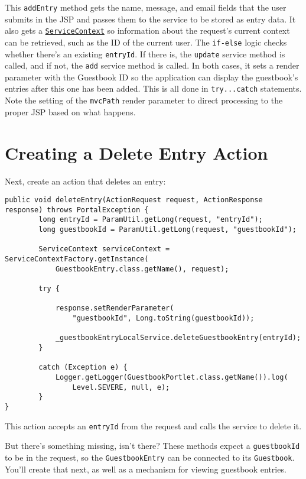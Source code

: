 This \texttt{addEntry} method gets the name, message, and email fields
that the user submits in the JSP and passes them to the service to be
stored as entry data. It also gets a
\href{/docs/7-2/frameworks/-/knowledge_base/f/understanding-servicecontext}{\texttt{ServiceContext}}
so information about the request's current context can be retrieved,
such as the ID of the current user. The \texttt{if-else} logic checks
whether there's an existing \texttt{entryId}. If there is, the
\texttt{update} service method is called, and if not, the \texttt{add}
service method is called. In both cases, it sets a render parameter with
the Guestbook ID so the application can display the guestbook's entries
after this one has been added. This is all done in \texttt{try...catch}
statements. Note the setting of the \texttt{mvcPath} render parameter to
direct processing to the proper JSP based on what happens.

\section{Creating a Delete Entry
Action}\label{creating-a-delete-entry-action}

Next, create an action that deletes an entry:

\begin{verbatim}
public void deleteEntry(ActionRequest request, ActionResponse response) throws PortalException {
        long entryId = ParamUtil.getLong(request, "entryId");
        long guestbookId = ParamUtil.getLong(request, "guestbookId");

        ServiceContext serviceContext = ServiceContextFactory.getInstance(
            GuestbookEntry.class.getName(), request);

        try {

            response.setRenderParameter(
                "guestbookId", Long.toString(guestbookId));

            _guestbookEntryLocalService.deleteGuestbookEntry(entryId);
        }

        catch (Exception e) {
            Logger.getLogger(GuestbookPortlet.class.getName()).log(
                Level.SEVERE, null, e);
        }
}
\end{verbatim}

This action accepts an \texttt{entryId} from the request and calls the
service to delete it.

But there's something missing, isn't there? These methods expect a
\texttt{guestbookId} to be in the request, so the
\texttt{GuestbookEntry} can be connected to its \texttt{Guestbook}.
You'll create that next, as well as a mechanism for viewing guestbook
entries.

